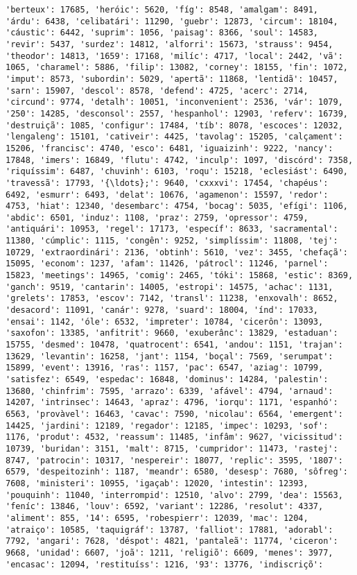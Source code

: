 \documentclass[11pt]{article}
\begin{document}
\begin{Verbatim}[commandchars=\\\{\}]
'berteux': 17685, 'heróic': 5620, 'fíg': 8548, 'amalgam': 8491, 'árdu': 6438, 'celibatári': 11290, 'guebr': 12873, 'circum': 18104, 'cáustic': 6442, 'suprim': 1056, 'paisag': 8366, 'soul': 14583, 'revir': 5437, 'surdez': 14812, 'alforri': 15673, 'strauss': 9454, 'theodor': 14813, '1659': 17168, 'milíc': 4717, 'local': 2442, 'vã': 1065, 'charamel': 5886, 'filip': 13082, 'corney': 18155, 'fin': 1072, 'imput': 8573, 'subordin': 5029, 'apertã': 11868, 'lentidã': 10457, 'sarn': 15907, 'descol': 8578, 'defend': 4725, 'acerc': 2714, 'circund': 9774, 'detalh': 10051, 'inconvenient': 2536, 'vár': 1079, '250': 14285, 'desconsol': 2557, 'hespanhol': 12903, 'referv': 16739, 'destruiçã': 1085, 'configur': 17484, 'tíb': 8078, 'escoces': 12032, 'lengaleng': 15101, 'cativeir': 4425, 'tavolag': 15205, 'calçament': 15206, 'francisc': 4740, 'esco': 6481, 'iguaizinh': 9222, 'nancy': 17848, 'imers': 16849, 'flutu': 4742, 'inculp': 1097, 'discórd': 7358, 'riquíssim': 6487, 'chuvinh': 6103, 'roqu': 15218, 'eclesiást': 6490, 'travessã': 17793, '{\ldots};': 9640, 'cxxxvi': 17454, 'chapéus': 6492, 'esmurr': 6493, 'delat': 10676, 'agamenon': 15597, 'redor': 4753, 'hiat': 12340, 'desembarc': 4754, 'bocag': 5035, 'efígi': 1106, 'abdic': 6501, 'induz': 1108, 'praz': 2759, 'opressor': 4759, 'antiquári': 10953, 'regel': 17173, 'específ': 8633, 'sacramental': 11380, 'cúmplic': 1115, 'congên': 9252, 'simplíssim': 11808, 'tej': 10729, 'extraordinári': 2136, 'obtinh': 5610, 'vez': 3455, 'chefaçã': 15095, 'econom': 1237, 'afam': 11426, 'pátrocl': 11246, 'parnel': 15823, 'meetings': 14965, 'comig': 2465, 'tóki': 15868, 'estic': 8369, 'ganch': 9519, 'cantarin': 14005, 'estropi': 14575, 'achac': 1131, 'grelets': 17853, 'escov': 7142, 'transl': 11238, 'enxovalh': 8652, 'desacord': 11091, 'canár': 9278, 'suard': 18004, 'índ': 17033, 'ensai': 1142, 'óle': 6532, 'impreter': 10784, 'cicerôn': 13093, 'saxofon': 13385, 'anfitrit': 9660, 'exuberânc': 13829, 'estaduan': 15755, 'desmed': 10478, 'quatrocent': 6541, 'andou': 1151, 'trajan': 13629, 'levantin': 16258, 'jant': 1154, 'boçal': 7569, 'serumpat': 15899, 'event': 13916, 'ras': 1157, 'pac': 6547, 'aziag': 10799, 'satisfez': 6549, 'espedac': 16848, 'dominus': 14284, 'palestin': 13680, 'chinfrim': 7595, 'arrazo': 6339, 'afável': 4794, 'arnaud': 14207, 'intrinsec': 14643, 'apraz': 4796, 'iorqu': 1171, 'espanhó': 6563, 'provàvel': 16463, 'cavac': 7590, 'nicolau': 6564, 'emergent': 14425, 'jardini': 12189, 'regador': 12185, 'impec': 10293, 'sof': 1176, 'produt': 4532, 'reassum': 11485, 'infâm': 9627, 'vicissitud': 10739, 'buridan': 3151, 'malt': 8715, 'cumpridor': 11473, 'rastej': 8747, 'patrocin': 10317, 'nespereir': 18077, 'replic': 3595, '1807': 6579, 'despeitozinh': 1187, 'meandr': 6580, 'desesp': 7680, 'sôfreg': 7608, 'ministeri': 10955, 'igaçab': 12020, 'intestin': 12393, 'pouquinh': 11040, 'interrompid': 12510, 'alvo': 2799, 'dea': 15563, 'feníc': 13846, 'louv': 6592, 'variant': 12286, 'resolut': 4337, 'aliment': 855, '14': 6595, 'robespierr': 12039, 'mac': 1204, 'atraiço': 10585, 'taquigráf': 13787, 'falliot': 17881, 'adorabl': 7792, 'angari': 7628, 'déspot': 4821, 'pantaleã': 11774, 'ciceron': 9668, 'unidad': 6607, 'joã': 1211, 'religiõ': 6609, 'menes': 3977, 'encasac': 12094, 'restituíss': 1216, '93': 13776, 'indiscriçõ': 
\end{Verbatim}
\end{document}
